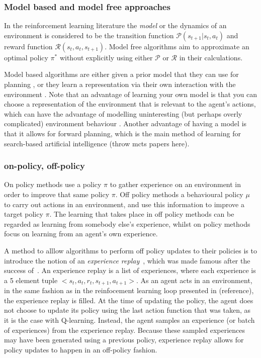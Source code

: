 \documentclass{../main.tex}{subfiles}
\begin{document}
\subsubsection{Model based and model free approaches}
In the reinforcement learning literature the \textit{model} or the dynamics of an environment is considered to be the transition function $\mathcal{P}(s_{t+1} | s_t, a_t)$ and reward function $\mathcal{R}(s_t, a_t, s_{t+1})$. Model free algorithms aim to approximate an optimal policy $\pi^*$ without explicitly using either $\mathcal{P}$ or $\mathcal{R}$ in their calculations.

Model based algorithms are either given a prior model that they can use for planning \citep{browne2012survey, Soemers2014}, or they learn a representation via their own interaction with the environment \citep{Sutton1991, Guzdial2017, Deisenroth2011}. Note that an advantage of learning your own model is that you can choose a representation of the environment that is relevant to the agent's actions, which can have the advantage of modelling uninteresting (but perhaps overly complicated) environment behaviour \citep{Pathak2017}. Another advantage of having a model is that it allows for forward planning, which is the main method of learning for search-based artificial intelligence (throw mcts papers here).


\subsubsection{on-policy, off-policy}
On policy methods use a policy $\pi$ to gather experience on an environment in order to improve that same policy $\pi$. Off policy methods a behavioural policy $\mu$ to carry out actions in an environment, and use this information to improve a target policy $\pi$. The learning that takes place in off policy methods can be regarded as learning from somebody else's experience, whilst on policy methods focus on learning from an agent's own experience.

A method to alllow algorithms to perform off policy updates to their policies is to introduce the notion of an \textit{experience replay}~\citep{Lin1993}, which was made famous after the success of~\cite{Mnih2013}. An experience replay is a list of experiences, where each experience is a 5 element tuple $<s_t, a_t, r_t, s_{t+1}, a_{t+1}>$. As an agent acts in an environment, in the same fashion as in the reinfocement learning loop presented in (reference), the experience replay is filled. At the time of updating the policy, the agent does not choose to update its policy using the last action function that was taken, as it is the case with Q-learning. Instead, the agent samples an experience (or batch of experiences) from the experience replay. Because these sampled experiences may have been generated using a previous policy, experience replay allows for policy updates to happen in an off-policy fashion.
\end{document}
